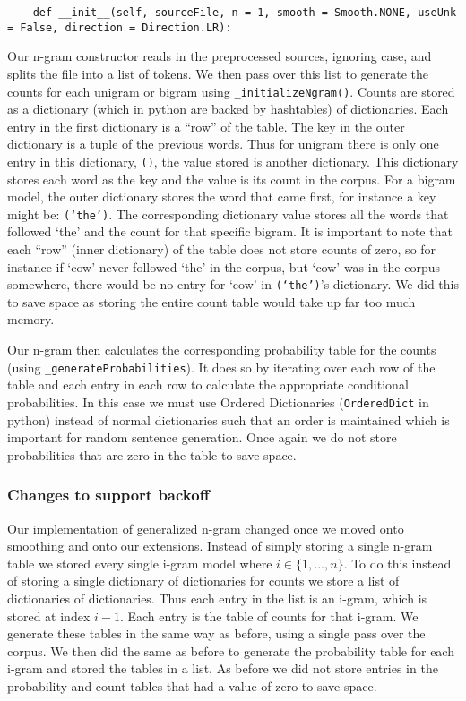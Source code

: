 \documentclass{article}
\begin{document}
{\small\begin{verbatim}
    def __init__(self, sourceFile, n = 1, smooth = Smooth.NONE, useUnk = False, direction = Direction.LR):
\end{verbatim}}

Our n-gram constructor reads in the preprocessed sources, ignoring case, and splits the file into a list of tokens. We then pass over this list to generate the counts for each unigram or bigram using \texttt{\_initializeNgram()}. Counts are stored as a dictionary (which in python are  backed by hashtables) of dictionaries. Each entry in the first dictionary is a ``row'' of the table. The key in the outer dictionary is a tuple of the previous words. Thus for unigram there is only one entry in this dictionary, \texttt{()}, the value stored is another dictionary. This dictionary stores each word as the key and the value is its count in the corpus. For a bigram model, the outer dictionary stores the word that came first, for instance a key might be: \texttt{(`the')}. The corresponding dictionary value stores all the words that followed `the' and the count for that specific bigram. It is important to note that each ``row'' (inner dictionary) of the table does not store counts of zero, so for instance if `cow' never followed `the' in the corpus, but `cow' was in the corpus somewhere, there would be no entry for `cow' in \texttt{(`the')}'s dictionary. We did this to save space as storing the entire count table would take up far too much memory. 

Our n-gram then calculates the corresponding probability table for the counts (using \texttt{\_generateProbabilities}). It does so by iterating over each row of the table and each entry in each row to calculate the appropriate conditional probabilities. In this case we must use Ordered Dictionaries (\texttt{OrderedDict} in python) instead of normal dictionaries such that an order is maintained which is important for random sentence generation. Once again we do not store probabilities that are zero in the table to save space. 

\subsubsection{Changes to support backoff}
Our implementation of generalized n-gram changed once we moved onto smoothing and onto our extensions. Instead of simply storing a single n-gram table we stored every single i-gram model where $i\in \lbrace 1,...,n \rbrace$. To do this instead of storing a single dictionary of dictionaries for counts we store a list of dictionaries of dictionaries. Thus each entry in the list is an i-gram, which is stored at index $i-1$. Each entry is the table of counts for that i-gram. We generate these tables in the same way as before, using a single pass over the corpus. We then did the same as before to generate the probability table for each i-gram and stored the tables in a list. As before we did not store entries in the probability and count tables that had a value of zero to save space.
\end{document}
